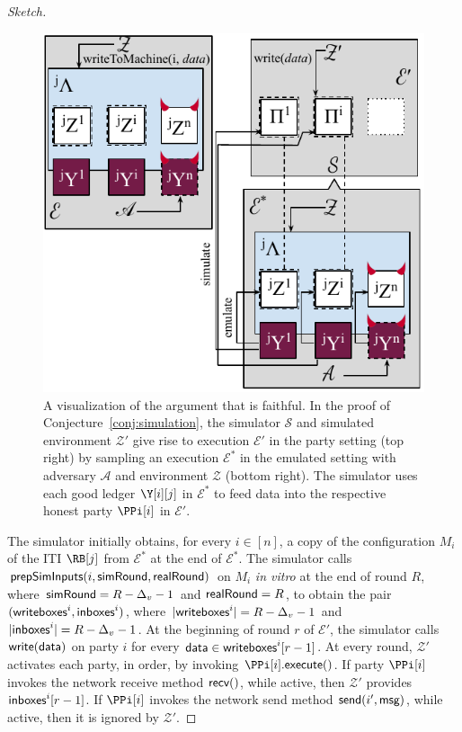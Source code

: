 \begin{proof}[Sketch]
  \begin{figure}
    \centering
    \includegraphics[width=0.7 \textwidth,keepaspectratio]{figures/rollerblade-emulation.pdf}
    \caption{A visualization of the argument that \rollerblade is faithful.
    In the proof of Conjecture~\ref{conj:simulation},
    the simulator $\mathcal{S}$ and simulated environment $\mathcal{Z}'$
    give rise to execution $\mathcal{E}'$ in the
    party setting (top right) by sampling an execution $\mathcal{E}^*$ in the emulated
    setting with adversary $\mathcal{A}$ and environment $\mathcal{Z}$
    (bottom right). The simulator uses each good ledger $\Y[i][j]$ in
    $\mathcal{E}^*$ to feed data into the respective honest party $\PPi[i]$
    in $\mathcal{E}'$. }
    \label{fig.conj.simulation}
  \end{figure}

  The simulator initially obtains, for every $i \in [n]$,
  a copy of the configuration $M_i$ of the ITI $\RB[j]$ from $\mathcal{E}^*$ at the end of
  $\mathcal{E}^*$.
  The simulator calls $\textsf{prepSimInputs}(i, \textsf{simRound}, \textsf{realRound})$ on $M_i$
  \emph{in vitro} at the end of round $R$, where $\textsf{simRound} = R - \Delta_v - 1$
  and $\textsf{realRound} = R$, to obtain the pair
  $(\textsf{writeboxes}^i, \textsf{inboxes}^i)$, where
  $|\textsf{writeboxes}^i| = R - \Delta_v - 1$
  and
  $|\textsf{inboxes}^i| = R - \Delta_v - 1$.
  At the beginning of round $r$ of $\mathcal{E}'$, the simulator calls
  $\textsf{write}(\textsf{data})$ on party $i$
  for every $\textsf{data} \in \textsf{writeboxes}^i[r - 1]$.
  At every round, $\mathcal{Z}'$ activates each party, in order,
  by invoking $\PPi[i].\execute()$.
  If party $\PPi[i]$ invokes the network receive method $\textsf{recv}()$, while active,
  then $\mathcal{Z}'$ provides $\textsf{inboxes}^i[r - 1]$.
  If $\PPi[i]$ invokes the network send method $\textsf{send}(i', \textsf{msg})$, while active,
  then it is ignored by $\mathcal{Z}'$.


\end{proof}
